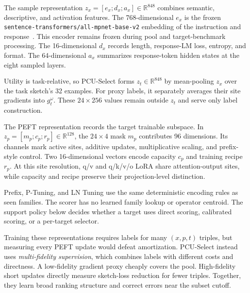 The sample representation $z_x=[e_x;d_x;a_x]\in\mathbb{R}^{848}$ combines semantic, descriptive, and activation features. The 768-dimensional $e_x$ is the frozen \texttt{sentence-transformers/all-mpnet-base-v2} embedding of the instruction and response~\cite{song2020mpnet,reimers2019sentencebert}. This encoder remains frozen during pool and target-benchmark processing. The 16-dimensional $d_x$ records length, response-LM loss, entropy, and format. The 64-dimensional $a_x$ summarizes response-token hidden states at the eight sampled layers.

Utility is task-relative, so PCU-Select forms $z_t\in\mathbb{R}^{848}$ by mean-pooling $z_x$ over the task sketch's 32 examples. For proxy labels, it separately averages their site gradients into $g_t^{\omega}$. These $24\times256$ values remain outside $z_t$ and serve only label construction.

The PEFT representation records the target trainable subspace. In $z_p=[m_p;c_p;r_p]\in\mathbb{R}^{128}$, the $24\times4$ mask $m_p$ contributes 96 dimensions. Its channels mark active sites, additive updates, multiplicative scaling, and prefix-style control. Two 16-dimensional vectors encode capacity $c_p$ and training recipe $r_p$. At this site resolution, q/v and q/k/v/o LoRA share attention-output sites, while capacity and recipe preserve their projection-level distinction.

Prefix, P-Tuning, and LN Tuning use the same deterministic encoding rules as seen families. The scorer has no learned family lookup or operator centroid. The support policy below decides whether a target uses direct scoring, calibrated scoring, or a per-target selector.

Training these representations requires labels for many $(x,p,t)$ triples, but measuring every PEFT update would defeat amortization. PCU-Select instead uses \emph{multi-fidelity supervision}, which combines labels with different costs and directness. A low-fidelity gradient proxy cheaply covers the pool. High-fidelity short updates directly measure sketch-loss reduction for fewer triples. Together, they learn broad ranking structure and correct errors near the subset cutoff.

